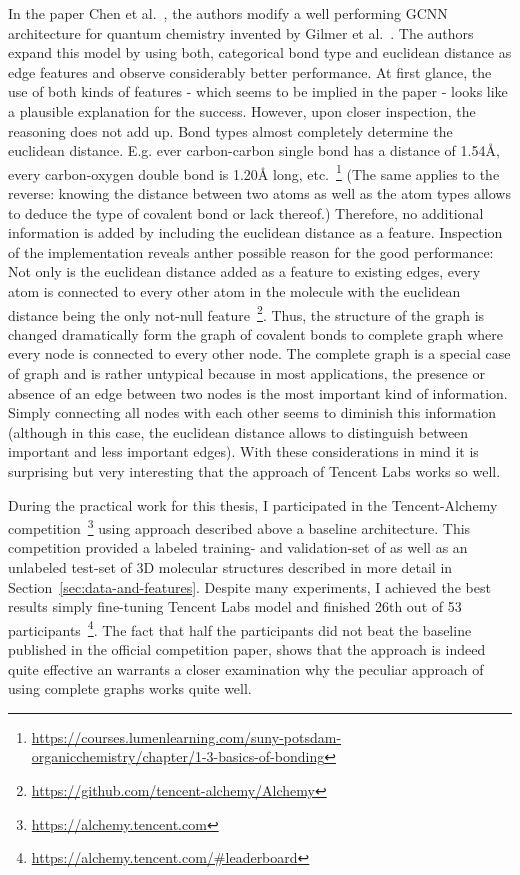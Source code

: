 In the paper Chen et al.~\cite{Chen2019}, the authors modify a well performing GCNN architecture for quantum chemistry invented by Gilmer et al.~\cite{Gilmer2017}. The authors expand this model by using both, categorical bond type and euclidean distance as edge features and observe considerably better performance. At first glance, the use of both kinds of features - which seems to be implied in the paper - looks like a plausible explanation for the success. However, upon closer inspection, the reasoning does not add up. Bond types almost completely determine the euclidean distance. E.g. ever carbon-carbon single bond has a distance of 1.54Å, every carbon-oxygen double bond is 1.20Å long, etc.~\footnote{\url{https://courses.lumenlearning.com/suny-potsdam-organicchemistry/chapter/1-3-basics-of-bonding}} (The same applies to the reverse: knowing the distance between two atoms as well as the atom types allows to deduce the type of covalent bond or lack thereof.) Therefore, no additional information is added by including the euclidean distance as a feature. Inspection of the implementation reveals anther possible reason for the good performance: Not only is the euclidean distance added as a feature to existing edges, every atom is connected to every other atom in the molecule with the euclidean distance being the only not-null feature~\footnote{\url{https://github.com/tencent-alchemy/Alchemy}}. Thus, the structure of the graph is changed dramatically form the graph of covalent bonds to complete graph where every node is connected to every other node. The complete graph is a special case of graph and is rather untypical because in most applications, the presence or absence of an edge between two nodes is the most important kind of information. Simply connecting all nodes with each other seems to diminish this information (although in this case, the euclidean distance allows to distinguish between important and less important edges). With these considerations in mind it is surprising but very interesting that the approach of Tencent Labs works so well.

During the practical work for this thesis, I participated in the Tencent-Alchemy competition~\footnote{\url{https://alchemy.tencent.com}} using approach described above a baseline architecture. This competition provided a labeled training- and validation-set of as well as an unlabeled test-set of 3D molecular structures described in more detail in Section~\ref{sec:data-and-features}. Despite many experiments, I achieved the best results simply fine-tuning Tencent Labs model and finished 26th out of 53 participants~\footnote{\url{https://alchemy.tencent.com/\#leaderboard}}. The fact that half the participants did not beat the baseline published in the official competition paper, shows that the approach is indeed quite effective an warrants a closer examination why the peculiar approach of using complete graphs works quite well.


